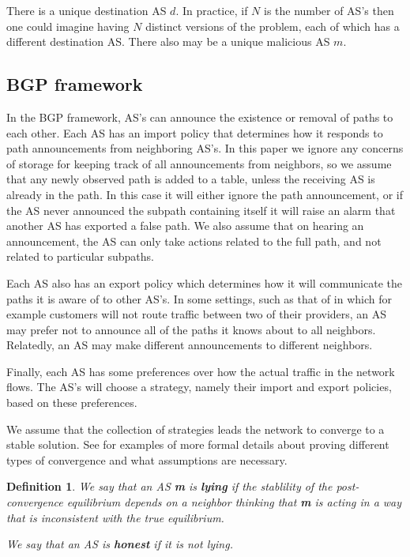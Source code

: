 \documentclass[12pt]{article}
\newtheorem{definition}{Definition}
\begin{document}
There is a unique destination AS $d$. In practice, if $N$ is the number of AS's then one could imagine having $N$ distinct versions of the problem, each of which has a different destination AS. There also may be a unique malicious AS $m$.

\subsection{BGP framework}
In the BGP framework, AS's can announce the existence or removal of paths to each other. Each AS has an import policy that determines how it responds to path announcements from neighboring AS's. In this paper we ignore any concerns of storage for keeping track of all announcements from neighbors, so we assume that any newly observed path is added to a table, unless the receiving AS is already in the path. In this case it will either ignore the path announcement, or if the AS never announced the subpath containing itself it will raise an alarm that another AS has exported a false path. We also assume that on hearing an announcement, the AS can only take actions related to the full path, and not related to particular subpaths.

Each AS also has an export policy which determines how it will communicate the paths it is aware of to other AS's. In some settings, such as that of \cite{GaoRexford} in which for example customers will not route traffic between two of their providers, an AS may prefer not to announce all of the paths it knows about to all neighbors. Relatedly, an AS may make different announcements to different neighbors.

Finally, each AS has some preferences over how the actual traffic in the network flows. The AS's will choose a strategy, namely their import and export policies, based on these preferences.

We assume that the collection of strategies leads the network to converge to a stable solution. See \cite{RoutingGames, Attraction, PolicyPathVector} for examples of more formal details about proving different types of convergence and what assumptions are necessary.

\begin{definition}
We say that an AS \textbf{m} is \textbf{lying} if the stablility of the post-convergence equilibrium depends on a neighbor thinking that \textbf{m} is acting in a way that is inconsistent with the true equilibrium.

We say that an AS is \textbf{honest} if it is not lying.
\end{definition}
\end{document}
